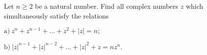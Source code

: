 Let $n\ge 2$ be a natural number. Find all complex numbers $z$ which simultaneously satisfy the relations

$\text{a)}\ z^n + z^{n - 1} + \ldots + z^2 + |z| = n;$

$\text{b)}\ |z|^{n- 1} + |z|^{n - 2} + \ldots + |z|^2 + z = n z^n.$